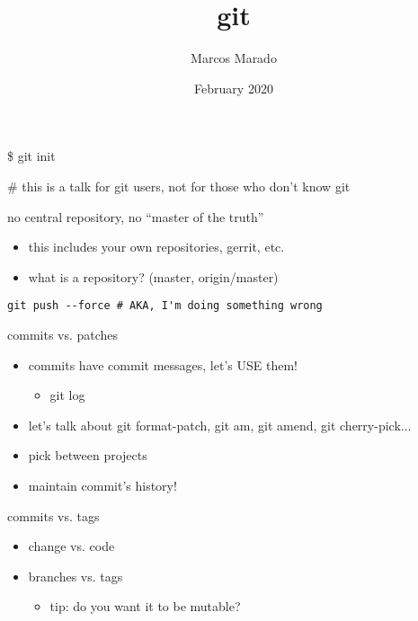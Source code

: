 \documentclass[landscape]{slides}
\author{Marcos Marado}
\title{git}
\date{February 2020}
\begin{document}
\begin{slide}
\maketitle
\end{slide}

\begin{slide}
\$ git init

\# this is a talk for git users, not for those who don't know git
\end{slide}

\begin{slide}
no central repository, no ``master of the truth''

\begin{itemize}
\item{} this includes your own repositories, gerrit, etc.
\item{} what is a repository? (master, origin/master)
\end{itemize}
\end{slide}

\begin{slide}
\begin{verbatim}
git push --force # AKA, I'm doing something wrong
\end{verbatim}
\end{slide}

\begin{slide}
commits vs. patches

\begin{itemize}
\item{} commits have commit messages, let's USE them!
	\begin{itemize}
	\item{} git log
	\end{itemize}
\item{} let's talk about git format-patch, git am, git amend, git cherry-pick...
\item{} pick between projects
\item{} maintain commit's history!
\end{itemize}
\end{slide}

\begin{slide}
commits vs. tags

\begin{itemize}
\item{} change vs. code
\item{} branches vs. tags
\begin{itemize}
\item{} tip: do you want it to be mutable?
\end{itemize}
\end{itemize}
\end{slide}
\end{document}
